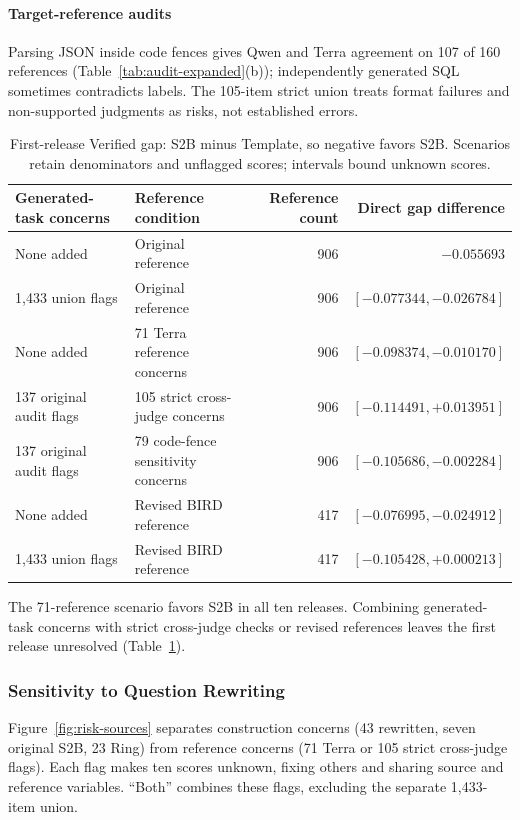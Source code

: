 \paragraph{Target-reference audits}
Parsing JSON inside code fences gives Qwen and Terra agreement on 107 of 160 references (Table~\ref{tab:audit-expanded}(b)); independently generated SQL sometimes contradicts labels. The 105-item strict union treats format failures and non-supported judgments as risks, not established errors.

\begin{table}[t]\centering\small
\caption{First-release Verified gap: S2B minus Template, so negative favors S2B. Scenarios retain denominators and unflagged scores; intervals bound unknown scores.}
\label{tab:reference-stress}
\begin{tabular}{llrr}\toprule
Generated-task concerns & Reference condition & Reference count & Direct gap difference\\\midrule
None added & Original reference &906&$\boldsymbol{-0.055693}$\\
1,433 union flags & Original reference &906&$\boldsymbol{[-0.077344,-0.026784]}$\\
None added & 71 Terra reference concerns &906&$\boldsymbol{[-0.098374,-0.010170]}$\\
137 original audit flags & 105 strict cross-judge concerns &906&$[-0.114491,+0.013951]$\\
137 original audit flags & 79 code-fence sensitivity concerns &906&$\boldsymbol{[-0.105686,-0.002284]}$\\
None added & Revised BIRD reference &417&$\boldsymbol{[-0.076995,-0.024912]}$\\
1,433 union flags & Revised BIRD reference &417&$[-0.105428,+0.000213]$\\\bottomrule
\end{tabular}\end{table}

The 71-reference scenario favors S2B in all ten releases. Combining generated-task concerns with strict cross-judge checks or revised references leaves the first release unresolved (Table~\ref{tab:reference-stress}).



\subsubsection{Sensitivity to Question Rewriting}\label{sec:risk-sources}
Figure~\ref{fig:risk-sources} separates construction concerns (43 rewritten, seven original S2B, 23 Ring) from reference concerns (71 Terra or 105 strict cross-judge flags). Each flag makes ten scores unknown, fixing others and sharing source and reference variables. ``Both'' combines these flags, excluding the separate 1,433-item union.



